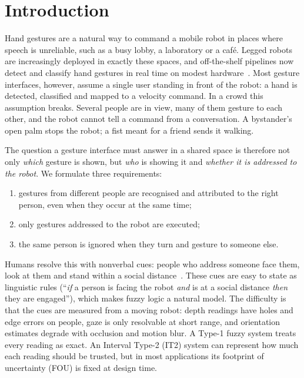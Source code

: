 \section{Introduction}
\label{sec:intro}

Hand gestures are a natural way to command a mobile robot in places where
speech is unreliable, such as a busy lobby, a laboratory or a caf\'e.
Legged robots are increasingly deployed in exactly these spaces, and
off-the-shelf pipelines now detect and classify hand gestures in real time on
modest hardware~\cite{zhang2020mediapipehands,kapitanov2024hagrid}. Most
gesture interfaces, however, assume a single user standing in front of the
robot: a hand is detected, classified and mapped to a velocity command. In a
crowd this assumption breaks. Several people are in view, many of them
gesture to each other, and the robot cannot tell a command from a
conversation. A bystander's open palm stops the robot; a fist meant for a
friend sends it walking.

The question a gesture interface must answer in a shared space is therefore
not only \emph{which} gesture is shown, but \emph{who} is showing it and
\emph{whether it is addressed to the robot}. We formulate three requirements:
\begin{enumerate}
\item[R1] gestures from different people are recognised and attributed to
  the right person, even when they occur at the same time;
\item[R2] only gestures addressed to the robot are executed;
\item[R3] the same person is ignored when they turn and gesture to someone
  else.
\end{enumerate}

Humans resolve this with nonverbal cues: people who address someone face
them, look at them and stand within a social distance~\cite{hall1966hidden,
kendon1990conducting}. These cues are easy to state as linguistic rules
(``\emph{if} a person is facing the robot \emph{and} is at a social distance
\emph{then} they are engaged''), which makes fuzzy logic a natural model.
The difficulty is that the cues are measured from a moving robot: depth
readings have holes and edge errors on people, gaze is only resolvable at
short range, and orientation estimates degrade with occlusion and motion
blur. A
Type-1 fuzzy system treats every reading as exact. An Interval Type-2 (IT2)
system can represent how much each reading should be trusted, but in most
applications its footprint of uncertainty (FOU) is fixed at design time.

